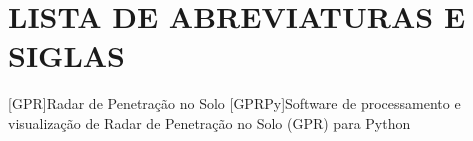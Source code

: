 \thispagestyle{empty}

\chapter*{\normalsize{\textbf{LISTA DE ABREVIATURAS E SIGLAS}}}


\begin{acronym}[]
    [GPR]{Radar de Penetração no Solo}
    [GPRPy]{Software de processamento e visualização de Radar de Penetração no Solo (GPR) para Python}



\end{acronym}